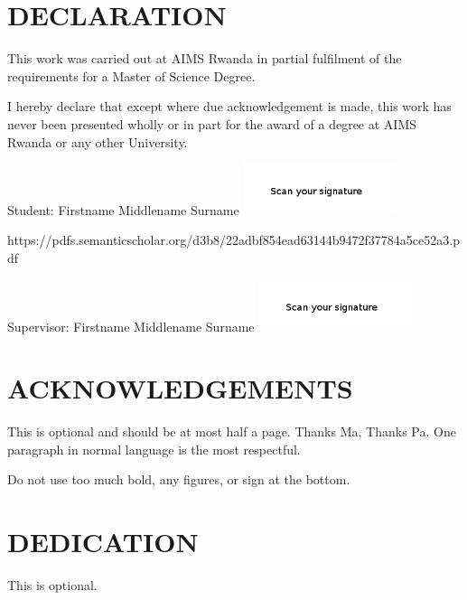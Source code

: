 \chapter*{DECLARATION}
This work was carried out at AIMS Rwanda in partial fulfilment of the requirements for a Master of Science Degree.

I hereby declare that except where due acknowledgement is made, this work has never been presented wholly or in part for the award of a degree at AIMS Rwanda or any other University.

\vspace{1.5cm}
Student: Firstname Middlename Surname \includegraphics[height=1.5cm]{images/signature.png}

\vspace{1.5cm}

https://pdfs.semanticscholar.org/d3b8/22adbf854ead63144b9472f37784a5ce52a3.pdf

Supervisor: Firstname Middlename Surname \includegraphics[height=1.5cm]{images/signature1.png}


\newpage

\chapter*{ACKNOWLEDGEMENTS}

This is optional and should be at most half a page.
Thanks Ma, Thanks Pa. One paragraph in normal language is the most respectful.  

Do not use too much bold, any figures, or sign at the bottom.
\newpage
\chapter*{DEDICATION} 

This is optional.